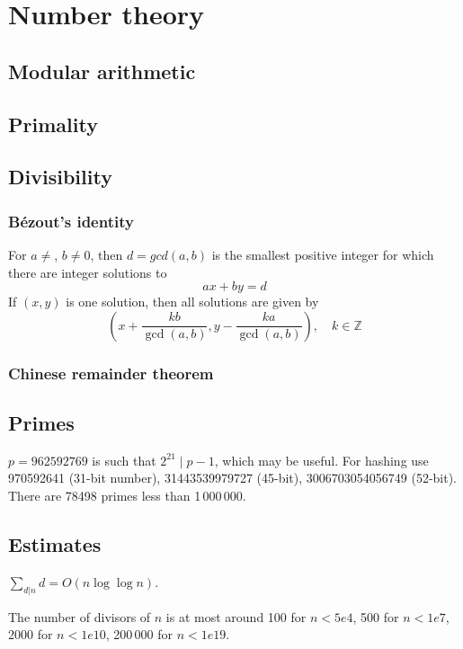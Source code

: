 \chapter{Number theory}

\section{Modular arithmetic}

\section{Primality}

\section{Divisibility}

	\subsection{Bézout's identity}
	For $a \neq $, $b \neq 0$, then $d=gcd(a,b)$ is the smallest positive integer for which there are integer solutions to
	$$ax+by=d$$
	If $(x,y)$ is one solution, then all solutions are given by
	$$\left(x+\frac{kb}{\gcd(a,b)}, y-\frac{ka}{\gcd(a,b)}\right), \quad k\in\mathbb{Z}$$


	\subsection{Chinese remainder theorem}

\section{Primes}
	$p=962592769$ is such that $2^{21} \mid p-1$, which may be useful. For hashing
	use 970592641 (31-bit number), 31443539979727 (45-bit), 3006703054056749
	(52-bit). There are 78498 primes less than 1\,000\,000.

\section{Estimates}
	$\sum_{d|n} d = O(n \log \log n)$.

	The number of divisors of $n$ is at most around 100 for $n < 5e4$, 500 for $n < 1e7$, 2000 for $n < 1e10$, 200\,000 for $n < 1e19$.

\hardcolumnbreak
